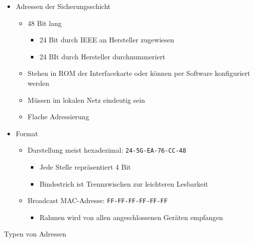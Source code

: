       \begin{itemize}
        \item Adressen der Sicherungsschicht
          \begin{itemize}
            \item 48 Bit lang
              \begin{itemize}
                \item 24 Bit durch IEEE an Hersteller zugewiesen
                \item 24 BIt durch Hersteller durchnummeriert
              \end{itemize}
            \item Stehen in ROM der Interfacekarte oder können per Software konfiguriert werden
            \item Müssen im lokalen Netz eindeutig sein
            \item Flache Adressierung
          \end{itemize}
        \item Format
          \begin{itemize}
            \item Darstellung meist hexadezimal: \verb!24-5G-EA-76-CC-48!
              \begin{itemize}
                \item Jede Stelle repräsentiert 4 Bit
                \item Bindestrich ist Trennzwischen zur leichteren Lesbarkeit
              \end{itemize}
            \item Broadcast MAC-Adresse: \verb!FF-FF-FF-FF-FF-FF!
              \begin{itemize}
                \item Rahmen wird von allen angeschlossenen Geräten empfangen
              \end{itemize}
          \end{itemize}
      \end{itemize}
      Typen von Adressen
